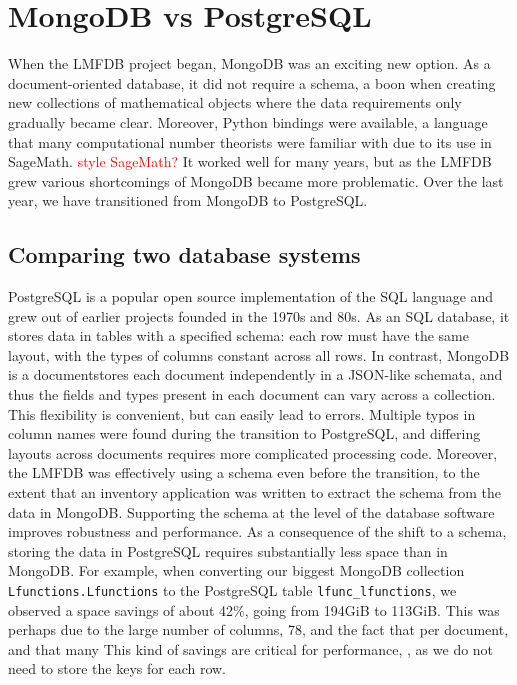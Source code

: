\documentclass{article}
\newcommand{\todo}[1]{\textcolor{red}{#1}}
\begin{document}
\section{MongoDB vs PostgreSQL}

When the LMFDB project began, MongoDB was an exciting new option.
As a document-oriented database, it did not require a schema, a boon when creating new collections of mathematical objects where the data requirements only gradually became clear.
Moreover, Python bindings were available, a language that many computational number theorists were familiar with due to its use in SageMath. \todo{style SageMath?}
It worked well for many years, but as the LMFDB grew various shortcomings of MongoDB became more problematic.
Over the last year, we have transitioned from MongoDB to PostgreSQL.

\subsection{Comparing two database systems}

PostgreSQL is a popular open source implementation of the SQL language and grew out of earlier projects founded in the 1970s and 80s.
As an SQL database, it stores data in tables with a specified schema: each row must have the same layout, with the types of columns constant across all rows.
In contrast, MongoDB is a documentstores each document independently in a JSON-like schemata,
and thus the fields and types present in each document can vary across a collection.
This flexibility is convenient, but can easily lead to errors.
Multiple typos in column names were found during the transition to PostgreSQL, and differing layouts across documents requires more complicated processing code.
Moreover, the LMFDB was effectively using a schema even before the transition, to the extent that an inventory application was written to extract the schema from the data in MongoDB.
Supporting the schema at the level of the database software improves robustness and performance.
As a consequence of the shift to a schema, storing the data in PostgreSQL requires substantially less space than in MongoDB.
For example, when converting our biggest MongoDB collection \texttt{Lfunctions.Lfunctions} to the PostgreSQL table \texttt{lfunc\_lfunctions}, we observed a space savings of about 42\%, going from 194GiB to 113GiB.
This was perhaps due to the large number of columns, 78, and the fact that  per document, and that many  
This kind of savings are critical for performance, 
, as we do not need to store the keys for each row.
\end{document}
